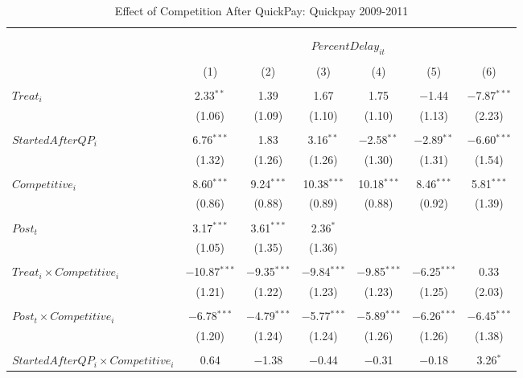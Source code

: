 \documentclass[]{article}
\begin{document}
\begin{table}[H] \centering 
  \caption{Effect of Competition After QuickPay: Quickpay 2009-2011} 
  \label{} 
\small 
\begin{tabular}{@{\extracolsep{-3pt}}lcccccc} 
\\[-1.8ex]\hline 
\hline \\[-1.8ex] 
\\[-1.8ex] & \multicolumn{6}{c}{$PercentDelay_{it}$  } \\ 
\\[-1.8ex] & (1) & (2) & (3) & (4) & (5) & (6)\\ 
\hline \\[-1.8ex] 
 $Treat_i$ & 2.33$^{**}$ & 1.39 & 1.67 & 1.75 & $-$1.44 & $-$7.87$^{***}$ \\ 
  & (1.06) & (1.09) & (1.10) & (1.10) & (1.13) & (2.23) \\ 
  & & & & & & \\ 
 $StartedAfterQP_i$ & 6.76$^{***}$ & 1.83 & 3.16$^{**}$ & $-$2.58$^{**}$ & $-$2.89$^{**}$ & $-$6.60$^{***}$ \\ 
  & (1.32) & (1.26) & (1.26) & (1.30) & (1.31) & (1.54) \\ 
  & & & & & & \\ 
 $Competitive_i$ & 8.60$^{***}$ & 9.24$^{***}$ & 10.38$^{***}$ & 10.18$^{***}$ & 8.46$^{***}$ & 5.81$^{***}$ \\ 
  & (0.86) & (0.88) & (0.89) & (0.88) & (0.92) & (1.39) \\ 
  & & & & & & \\ 
 $Post_t$ & 3.17$^{***}$ & 3.61$^{***}$ & 2.36$^{*}$ &  &  &  \\ 
  & (1.05) & (1.35) & (1.36) &  &  &  \\ 
  & & & & & & \\ 
 $Treat_i \times Competitive_i$ & $-$10.87$^{***}$ & $-$9.35$^{***}$ & $-$9.84$^{***}$ & $-$9.85$^{***}$ & $-$6.25$^{***}$ & 0.33 \\ 
  & (1.21) & (1.22) & (1.23) & (1.23) & (1.25) & (2.03) \\ 
  & & & & & & \\ 
 $Post_t \times Competitive_i$ & $-$6.78$^{***}$ & $-$4.79$^{***}$ & $-$5.77$^{***}$ & $-$5.89$^{***}$ & $-$6.26$^{***}$ & $-$6.45$^{***}$ \\ 
  & (1.20) & (1.24) & (1.24) & (1.26) & (1.26) & (1.38) \\ 
  & & & & & & \\ 
 $StartedAfterQP_i \times Competitive_i$ & 0.64 & $-$1.38 & $-$0.44 & $-$0.31 & $-$0.18 & 3.26$^{*}$ \\ 

\end{tabular}
\end{table}
\end{document}
